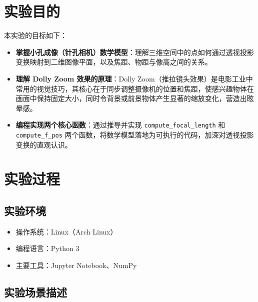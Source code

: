 \documentclass[12pt,a4paper]{ctexart}
\title{\reporttitle}
\author{\authname：\underline{李祥熙} \quad \authid：\underline{2234412799} \quad \class：\underline{计算机2301}}
\date{}
\begin{document}
\maketitle
\tableofcontents
\newpage

\section{实验目的}

本实验的目标如下：

\begin{itemize}
  \item \textbf{掌握小孔成像（针孔相机）数学模型}：理解三维空间中的点如何通过透视投影变换映射到二维图像平面，以及焦距、物距与像高之间的关系。
  \item \textbf{理解 Dolly Zoom 效果的原理}：Dolly Zoom（推拉镜头效果）是电影工业中常用的视觉技巧，其核心在于同步调整摄像机的位置和焦距，使感兴趣物体在画面中保持固定大小，同时令背景或前景物体产生显著的缩放变化，营造出眩晕感。
  \item \textbf{编程实现两个核心函数}：通过推导并实现 \texttt{compute\_focal\_length} 和 \texttt{compute\_f\_pos} 两个函数，将数学模型落地为可执行的代码，加深对透视投影变换的直观认识。
\end{itemize}

\section{实验过程}

\subsection{实验环境}

\begin{itemize}
  \item 操作系统：Linux（Arch Linux）
  \item 编程语言：Python 3
  \item 主要工具：Jupyter Notebook、NumPy
\end{itemize}

\subsection{实验场景描述}
\end{document}
